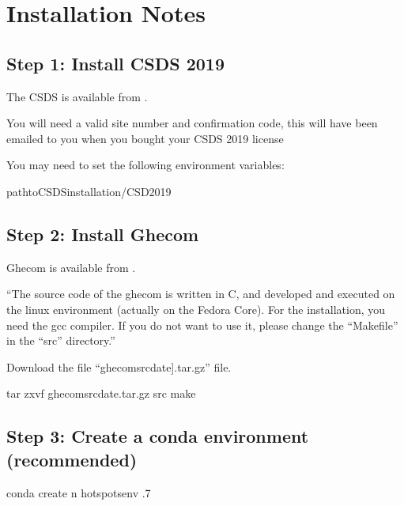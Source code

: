\documentclass[letterpaper,10pt,english]{sphinxmanual}
\begin{document}
\chapter{Installation Notes}
\label{\detokenize{tutorial:installation-notes}}

\section{Step 1: Install CSDS 2019}
\label{\detokenize{tutorial:step-1-install-csds-2019}}
The CSDS is available from .

You will need a valid site number and confirmation code, this will have been emailed to you when you bought your
CSDS 2019 license

You may need to set the following environment variables:

\begin{sphinxVerbatim}[commandchars=\\\{\}]
 \PYGZlt{}path\PYGZus{}to\PYGZus{}CSDS\PYGZus{}installation\PYGZgt{}/CSD\PYGZus{}2019
\end{sphinxVerbatim}


\section{Step 2: Install Ghecom}
\label{\detokenize{tutorial:step-2-install-ghecom}}
Ghecom is available from .

“The source code of the ghecom is written in C, and developed and executed on
the linux environment (actually on the Fedora Core).  For the installation,
you need the gcc compiler.  If you do not want to use it, please change the
“Makefile” in the “src” directory.”

Download the file “ghecom\sphinxhyphen{}src\sphinxhyphen{}{[}date{]}.tar.gz” file.

\begin{sphinxVerbatim}[commandchars=\\\{\}]
tar zxvf ghecom\PYGZhy{}src\PYGZhy{}\PYG{o}{[}date\PYG{o}{]}.tar.gz
 src
make
 
\end{sphinxVerbatim}


\section{Step 3: Create a conda environment (recommended)}
\label{\detokenize{tutorial:step-3-create-a-conda-environment-recommended}}
\begin{sphinxVerbatim}[commandchars=\\\{\}]
conda create \PYGZhy{}n hotspots\PYGZus{}env .7
\end{sphinxVerbatim}
\end{document}

